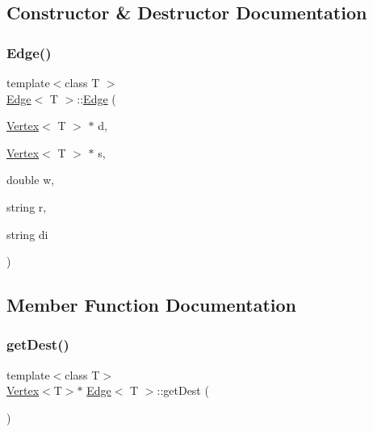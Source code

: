 \subsection{Constructor \& Destructor Documentation}
\mbox{\label{class_edge_aba1f7e4e068577ca4687da274ecbb5f9}} 
\subsubsection{\texorpdfstring{Edge()}{Edge()}}
{\footnotesize\ttfamily template$<$class T $>$ \\
\hyperlink{class_edge}{Edge}$<$ T $>$\+::\hyperlink{class_edge}{Edge} (\begin{DoxyParamCaption}\item[{\hyperlink{class_vertex}{Vertex}$<$ T $>$ $\ast$}]{d,  }\item[{\hyperlink{class_vertex}{Vertex}$<$ T $>$ $\ast$}]{s,  }\item[{double}]{w,  }\item[{string}]{r,  }\item[{string}]{di }\end{DoxyParamCaption})}



\subsection{Member Function Documentation}
\mbox{\label{class_edge_aaac5b053bdaa88b1da416e734487eb25}} 
\subsubsection{\texorpdfstring{get\+Dest()}{getDest()}}
{\footnotesize\ttfamily template$<$class T$>$ \\
\hyperlink{class_vertex}{Vertex}$<$T$>$$\ast$ \hyperlink{class_edge}{Edge}$<$ T $>$\+::get\+Dest (\begin{DoxyParamCaption}{ }\end{DoxyParamCaption})\hspace{0.3cm}{\ttfamily [inline]}}

